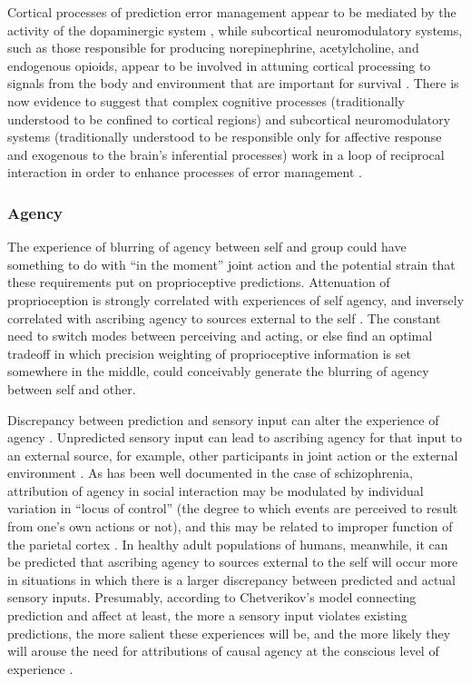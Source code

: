 \begin{CJK}{UTF8}{gbsn}
Cortical processes of prediction error management appear to be mediated by the activity of the dopaminergic system \citep{Schultz2016}, while subcortical neuromodulatory systems, such as those responsible for producing norepinephrine, acetylcholine, and endogenous opioids, appear to be involved in attuning cortical processing to signals from the body and environment that are important for survival \citep{Lewis2005}.  There is now evidence to suggest that complex cognitive processes (traditionally understood to be confined to cortical regions) and subcortical neuromodulatory systems (traditionally understood to be responsible only for affective response and exogenous to the brain's inferential processes) work in a loop of reciprocal interaction in order to enhance processes of error management \citep{Damasio1994,Lewis2005,Miller2017,Barrett2017}.

\subsubsection{Agency}
The experience of blurring of agency between self and group could have something to do with ``in the moment'' joint action and the potential strain that these requirements put on proprioceptive predictions.  Attenuation of proprioception is strongly correlated with experiences of self agency, and inversely correlated with ascribing agency to sources external to the self \citep{Brown2013}.  The constant need to switch modes between perceiving and acting, or else find an optimal tradeoff in which precision weighting of proprioceptive information is set somewhere in the middle, could conceivably generate the blurring of agency between self and other.

Discrepancy between prediction and sensory input can alter the experience of agency \citep{Sato2008}.  Unpredicted sensory input can lead to ascribing agency for that input to an external source, for example, other participants in joint action or the external environment \citep{Sato2005,Frith2007}.  As has been well documented in the case of schizophrenia, attribution of agency in social interaction may be modulated by individual variation in ``locus of control'' (the degree to which events are perceived to result from one’s own actions or not), and this may be related to improper function of the parietal cortex \citep{Frith2000}. In healthy adult populations of humans, meanwhile, it can be predicted that ascribing agency to sources external to the self will occur more in situations in which there is a larger discrepancy between predicted and actual sensory inputs. Presumably, according to Chetverikov's model connecting prediction and affect at least, the more a sensory input violates existing predictions, the more salient these experiences will be, and the more likely they will arouse the need for attributions of causal agency at the conscious level of experience \citep{Pesquita2017}.



\end{CJK}
